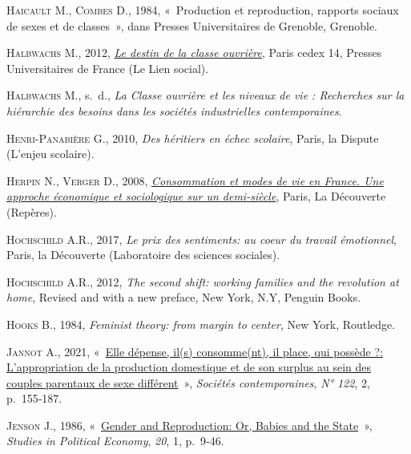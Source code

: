 \documentclass[
  12pt,
]{book}
\newlength{\cslhangindent}
\newenvironment{CSLReferences}[2] %
 {\begin{list}{}{%
  \setlength{\itemindent}{0pt}
  \setlength{\leftmargin}{0pt}
  \setlength{\parsep}{0pt}
  \ifodd #1
   \setlength{\leftmargin}{\cslhangindent}
   \setlength{\itemindent}{-1\cslhangindent}
  \fi
  \setlength{\itemsep}{#2\baselineskip}}}
 {\end{list}}
\begin{document}
\begin{CSLReferences}{0}{1}
\textsc{Haicault M.}, \textsc{Combes D.}, 1984, {«~Production et
reproduction, rapports sociaux de sexes et de classes~»}, dans Presses
Universitaires de Grenoble, Grenoble.

\textsc{Halbwachs M.}, 2012,
\emph{\href{https://www.cairn.info/le-destin-de-la-classe-ouvriere--9782130585909.htm}{Le
destin de la classe ouvrière}}, Paris cedex 14, Presses Universitaires
de France (Le Lien social).

\textsc{Halbwachs M.}, s.~d., \emph{La Classe ouvrière et les niveaux de
vie : Recherches sur la hiérarchie des besoins dans les sociétés
industrielles contemporaines}.

\textsc{Henri-Panabière G.}, 2010, \emph{Des héritiers en échec
scolaire}, Paris, la Dispute (L'enjeu scolaire).

\textsc{Herpin N.}, \textsc{Verger D.}, 2008,
\emph{\href{https://www.cairn.info/consommation-et-modes-de-vie-en-france--9782707156655.htm}{Consommation
et modes de vie en France. Une approche économique et sociologique sur
un demi-siècle}}, Paris, La Découverte (Repères).

\textsc{Hochschild A.R.}, 2017, \emph{Le prix des sentiments: au coeur
du travail émotionnel}, Paris, la Découverte (Laboratoire des sciences
sociales).

\textsc{Hochschild A.R.}, 2012, \emph{The second shift: working families
and the revolution at home}, Revised and with a new preface, New York,
N.Y, Penguin Books.

\textsc{Hooks B.}, 1984, \emph{Feminist theory: from margin to center},
New York, Routledge.

\textsc{Jannot A.}, 2021,
{«~\href{https://doi.org/10.3917/soco.122.0155}{Elle dépense, il(s)
consomme(nt), il place, qui possède ?: L'appropriation de la production
domestique et de son surplus au sein des couples parentaux de sexe
différent}~»}, \emph{Sociétés contemporaines}, \emph{N° 122}, 2,
p.~155‑187.

\textsc{Jenson J.}, 1986,
{«~\href{https://doi.org/10.1080/19187033.1986.11675588}{Gender and
Reproduction: Or, Babies and the State}~»}, \emph{Studies in Political
Economy}, \emph{20}, 1, p.~9‑46.


\end{CSLReferences}
\end{document}
